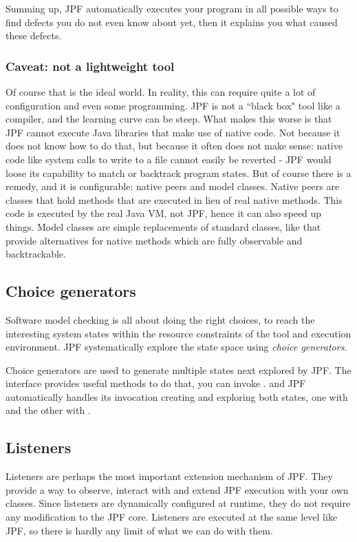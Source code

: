 Summing up, JPF automatically executes your program in all possible ways to find defects you do not even know about yet, then it explains you what caused these defects.

\subsubsection{Caveat: not a lightweight tool}
Of course that is the ideal world. In reality, this can require quite a lot of configuration and even some programming. JPF is not a ``black box" tool like a compiler, and the learning curve can be steep. What makes this worse is that JPF cannot execute Java libraries that make use of native code. Not because it does not know how to do that, but because it often does not make sense: native code like system calls to write to a file cannot easily be reverted - JPF would loose its capability to match or backtrack program states. But of course there is a remedy, and it is configurable: native peers and model classes. Native peers are classes that hold methods that are executed in lieu of real native methods. This code is executed by the real Java VM, not JPF, hence it can also speed up things. Model classes are simple replacements of standard classes, like  that provide alternatives for native methods which are fully observable and backtrackable.

\subsection{Choice generators}
Software model checking is all about doing the right choices, to reach the interesting system states within the resource constraints of the tool and execution environment. JPF systematically explore the state space using \emph{choice generators}.
 
Choice generators are used to generate multiple states next explored by JPF. The interface  provides useful methods to do that, \eg you can invoke . and JPF automatically handles its invocation creating and exploring both states, one with  and the other with .

\subsection{Listeners}
Listeners are perhaps the most important extension mechanism of JPF. They provide a way to observe, interact with and extend JPF execution with your own classes. Since listeners are dynamically configured at runtime, they do not require any modification to the JPF core. Listeners are executed at the same level like JPF, so there is hardly any limit of what we can do with them.

